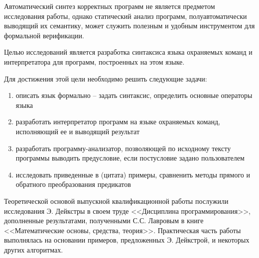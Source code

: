 Автоматический синтез корректных программ не является предметом исследования работы, 
однако статический анализ программ, полуавтоматически выводящий их семантику, может служить полезным и удобным инструментом для формальной верификации. 

Целью исследований является разработка синтаксиса языка охраняемых команд и интерпретатора для программ, 
построенных на этом языке.

Для достижения этой цели необходимо решить следующие задачи:
\begin{enumerate}
	\item описать язык формально -- задать синтаксис, определить основные операторы языка
	\item разработать интерпретатор программ на языке охраняемых команд, исполняющий ее и выводящий результат
	\item разработать программу-анализатор, позволяющей по исходному тексту программы выводить предусловие, если постусловие задано пользователем
	\item исследовать приведенные в (цитата) примеры, сравненить методы прямого и обратного преобразования предикатов
\end{enumerate} 


Теоретической основой выпускной квалификационной работы послужили исследования Э. Дейкстры 
в своем труде <<Дисциплина программирования>>, дополненные результатами, полученными С.С. Лавровым в книге <<Математические основы, средства, теория>>.
Практическая часть работы выполнялась на основании примеров, предложенных Э. Дейкстрой, и некоторых других алгоритмах.



